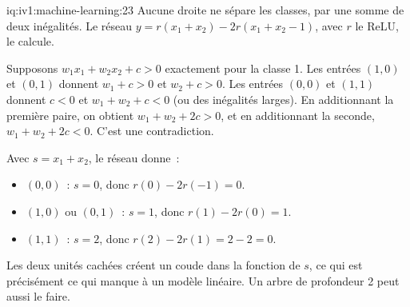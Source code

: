 \begin{solution}{iq:iv1:machine-learning:23}
Aucune droite ne sépare les classes, par une somme de deux inégalités. Le réseau $y = r(x_1 + x_2) - 2r(x_1 + x_2 - 1)$, avec $r$ le ReLU, le calcule.

Supposons $w_1x_1 + w_2x_2 + c > 0$ exactement pour la classe 1. Les entrées $(1, 0)$ et $(0, 1)$ donnent $w_1 + c > 0$ et $w_2 + c > 0$. Les entrées $(0, 0)$ et $(1, 1)$ donnent $c < 0$ et $w_1 + w_2 + c < 0$ (ou des inégalités larges). En additionnant la première paire, on obtient $w_1 + w_2 + 2c > 0$, et en additionnant la seconde, $w_1 + w_2 + 2c < 0$. C'est une contradiction.

Avec $s = x_1 + x_2$, le réseau donne~:
\begin{itemize}
\item $(0, 0)$~: $s = 0$, donc $r(0) - 2r(-1) = 0$.
\item $(1, 0)$ ou $(0, 1)$~: $s = 1$, donc $r(1) - 2r(0) = 1$.
\item $(1, 1)$~: $s = 2$, donc $r(2) - 2r(1) = 2 - 2 = 0$.
\end{itemize}
Les deux unités cachées créent un coude dans la fonction de $s$, ce qui est précisément ce qui manque à un modèle linéaire. Un arbre de profondeur 2 peut aussi le faire.



\end{solution}


